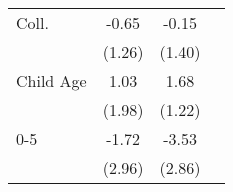 \begin{tabular}{lccc}
Coll.&-0.65&-0.15&\\&(1.26)&(1.40)&\\Child Age&1.03&1.68&\\&(1.98)&(1.22)&\\0-5&-1.72&-3.53&\\&(2.96)&(2.86)&\\\bottomrule\end{tabular}



